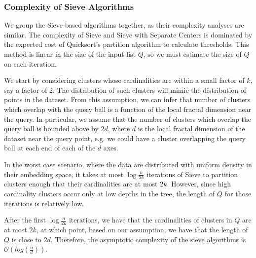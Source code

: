 \subsubsection{Complexity of Sieve Algorithms}
\label{paragraph:methods:sieve-complexity}

We group the Sieve-based algorithms together, as their complexity analyses are similar.
The complexity of Sieve and Sieve with Separate Centers is dominated by the expected cost of Quicksort's partition algorithm to calculate thresholds.
This method is linear in the size of the input list $Q$, so we must estimate the size of $Q$ on each iteration. 

We start by considering clusters whose cardinalities are within a small factor of $k$, say a factor of 2.
The distribution of such clusters will mimic the distribution of points in the dataset. 
From this assumption, we can infer that number of clusters which overlap with the query ball is a function of the local fractal dimension near the query.
In particular, we assume that the number of clusters which overlap the query ball is bounded above by 2$d$, where $d$ is the local fractal dimension of the dataset near the query point, e.g. we could have a cluster overlapping the query ball at each end of each of the $d$ axes.

In the worst case scenario, where the data are distributed with uniform density in their embedding space, it takes at most $\log{\frac{n}{2k}}$ iterations of Sieve to partition clusters enough that their cardinalities are at most $2k$.
However, since high cardinality clusters occur only at low depths in the tree, the length of $Q$ for those iterations is relatively low. 

After the first $\log{\frac{n}{2k}}$ iterations, we have that the cardinalities of clusters in $Q$ are at most $2k$, at which point, based on our assumption, we have that the length of $Q$ is close to $2d$.
Therefore, the asymptotic complexity of the sieve algorithms is $\mathcal{O}\left(log(\frac{n}{d})\right)$.
